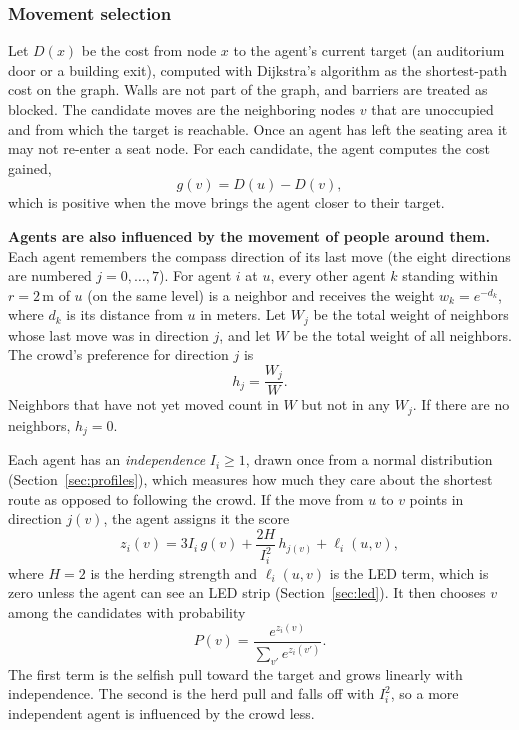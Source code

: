 \documentclass{article}
\begin{document}
\subsubsection{Movement selection}
\label{sec:selection}

Let $D(x)$ be the cost from node $x$ to the agent's current target (an auditorium door or a building exit), computed with Dijkstra's algorithm as the shortest-path cost on the graph. Walls are not part of the graph, and barriers are treated as blocked. The candidate moves are the neighboring nodes $v$ that are unoccupied and from which the target is reachable. Once an agent has left the seating area it may not re-enter a seat node. For each candidate, the agent computes the cost gained,
\begin{equation}
g(v) = D(u) - D(v),
\end{equation}
which is positive when the move brings the agent closer to their target.

\textbf{Agents are also influenced by the movement of people around them.} Each agent remembers the compass direction of its last move (the eight directions are numbered $j = 0, \dots, 7$). For agent $i$ at $u$, every other agent $k$ standing within $r = 2$\,m of $u$ (on the same level) is a neighbor and receives the weight $w_k = e^{-d_k}$, where $d_k$ is its distance from $u$ in meters. Let $W_j$ be the total weight of neighbors whose last move was in direction $j$, and let $W$ be the total weight of all neighbors. The crowd's preference for direction $j$ is
\begin{equation}
h_j = \frac{W_j}{W}.
\end{equation}
Neighbors that have not yet moved count in $W$ but not in any $W_j$. If there are no neighbors, $h_j = 0$.

Each agent has an \emph{independence} $I_i \ge 1$, drawn once from a normal distribution (Section~\ref{sec:profiles}), which measures how much they care about the shortest route as opposed to following the crowd. If the move from $u$ to $v$ points in direction $j(v)$, the agent assigns it the score
\begin{equation}
z_i(v) = 3 I_i\, g(v) + \frac{2H}{I_i^{2}}\, h_{j(v)} + \ell_i(u,v),
\label{eq:score}
\end{equation}
where $H = 2$ is the herding strength and $\ell_i(u,v)$ is the LED term, which is zero unless the agent can see an LED strip (Section~\ref{sec:led}). It then chooses $v$ among the candidates with probability
\begin{equation}
P(v) = \frac{e^{z_i(v)}}{\sum_{v'} e^{z_i(v')}} .
\end{equation}
The first term is the selfish pull toward the target and grows linearly with independence. The second is the herd pull and falls off with $I_i^2$, so a more independent agent is influenced by the crowd less.
\end{document}
